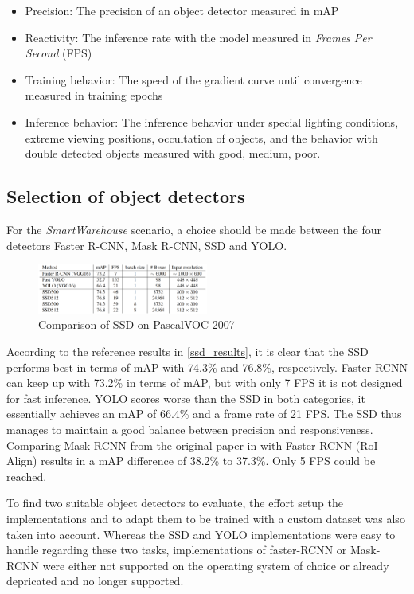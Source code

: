 \documentclass[a4paper, 10pt, journal]{wissarbIEEE}      %
\begin{document}
\begin{itemize}
	\item Precision: The precision of an object detector measured in mAP
	\item Reactivity: The inference rate with the model measured in \textit{Frames Per Second} (FPS)
	\item Training behavior: The speed of the gradient curve until convergence measured in training epochs
	\item Inference behavior: The inference behavior under special lighting conditions, extreme viewing positions, occultation of objects, and the behavior with double detected objects measured with good, medium, poor. 
\end{itemize}

\subsection{Selection of object detectors}

For the \textit{SmartWarehouse} scenario, a choice should be made between the four detectors Faster R-CNN, Mask R-CNN, SSD and YOLO. 

\begin{figure}[h]
	\centering
	\includegraphics[width=0.5\textwidth]{fig/ssd_results.png}
	\caption{Comparison of SSD on PascalVOC 2007 \cite{WeiLiuDragomirAnguelovDumitruErhanChristianSzegedyScottReedChengYangFuAlexander.2016}}
	\label{ssd_results}
\end{figure}

According to the reference results in \autoref{ssd_results}, it is clear that the SSD performs best in terms of mAP with 74.3\% and 76.8\%, respectively. Faster-RCNN can keep up with 73.2\% in terms of mAP,
but with only 7 FPS it is not designed for fast inference. YOLO scores worse than the SSD in both categories, it essentially achieves an mAP of 66.4\% and a frame rate of 21 FPS. The SSD thus manages to maintain a good balance between precision and responsiveness. Comparing Mask-RCNN from the original paper in \cite{KaimingHeGeorgiaGkioxariPiotrDollarRossGirshick.2018} with Faster-RCNN (RoI-Align) results in a mAP difference of 38.2\% to 37.3\%. Only 5 FPS could be reached. 

To find two suitable object detectors to evaluate, the effort setup the implementations and to adapt them to be trained with a custom dataset was also taken into account. Whereas the SSD and YOLO implementations were easy to handle regarding these two tasks, implementations of faster-RCNN or Mask-RCNN were either not supported on the operating system of choice or already depricated and no longer supported. 
\end{document}
